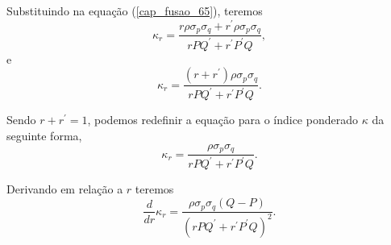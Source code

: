 Substituindo na equação (\ref{cap_fusao_65}), teremos
\begin{equation}\nonumber
	\kappa_r = \frac{r\rho \sigma_p\sigma_q + r^{'}\rho \sigma_p\sigma_q}{rPQ^{'} +r^{'}P^{'}Q},
\end{equation}
e
\begin{equation}\nonumber
	\kappa_r = \frac{(r+ r^{'})\rho \sigma_p\sigma_q}{rPQ^{'} +r^{'}P^{'}Q}.
\end{equation}

Sendo $r+r^{'}=1$, podemos redefinir a equação para o índice ponderado $\kappa$ da seguinte forma,
\begin{equation}\label{cap_fusao_26}
	\kappa_r = \frac{\rho \sigma_p\sigma_q}{rPQ^{'} +r^{'}P^{'}Q}.
\end{equation}

Derivando em relação a $r$ teremos
\begin{equation}\label{cap_fusao_26}
	\frac{d}{dr} \kappa_r= \frac{\rho \sigma_p\sigma_q(Q-P)}{(rPQ^{'} +r^{'}P^{'}Q)^2}.
\end{equation}
